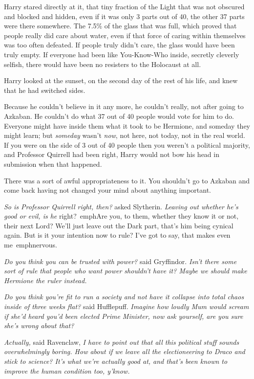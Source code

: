 Harry stared directly at it, that tiny fraction of the Light that was not 
obscured and blocked and hidden, even if it was only 3 parts out of 40, the 
other 37 parts were there somewhere. The 7.5\% of the glass that was full, which 
proved that people really did care about water, even if that force of caring 
within themselves was too often defeated. If people truly didn't care, the 
glass would have been truly empty. If everyone had been like You-Know-Who 
inside, secretly cleverly selfish, there would have been no resisters to the 
Holocaust at all.

Harry looked at the sunset, on the second day of the rest of his life, and knew 
that he had switched sides.

Because he couldn't believe in it any more, he couldn't really, not after going 
to Azkaban. He couldn't do what 37 out of 40 people would vote for him to do. 
Everyone might have inside them what it took to be Hermione, and someday they 
might learn; but \emph{someday} wasn't \emph{now}, not here, not today, not in 
the real world. If you were on the side of 3 out of 40 people then you weren't 
a political majority, and Professor Quirrell had been right, Harry would not 
bow his head in submission when that happened.

There was a sort of awful appropriateness to it. You shouldn't go to Azkaban 
and come back having not changed your mind about anything important.

\emph{So is Professor Quirrell right, then?} asked Slytherin. \emph{Leaving out 
whether he's good or evil, is he} right?\ emph{Are you, to them, whether they 
know it or not, their next Lord? We'll just leave out the Dark part, that's him 
being cynical again. But is it your intention now to rule? I've got to say, 
that makes even} me\ emph{nervous.}

\emph{Do you think you can be trusted with power?} said Gryffindor. \emph{Isn't 
there some sort of rule that people who want power shouldn't have it? Maybe we 
should make Hermione the ruler instead.\\
}

\emph{Do you think you're fit to run a society and not have it collapse into 
total chaos inside of three weeks flat?} said Hufflepuff. \emph{Imagine how 
loudly Mum would scream if she'd heard you'd been elected Prime Minister, now 
ask yourself, are you sure she's wrong about that?}

\emph{Actually,} said Ravenclaw, \emph{I have to point out that all this 
political stuff sounds overwhelmingly boring. How about if we leave all the 
electioneering to Draco and stick to science? It's what we're actually good at, 
and that's been known to improve the human condition too, y'know.}

